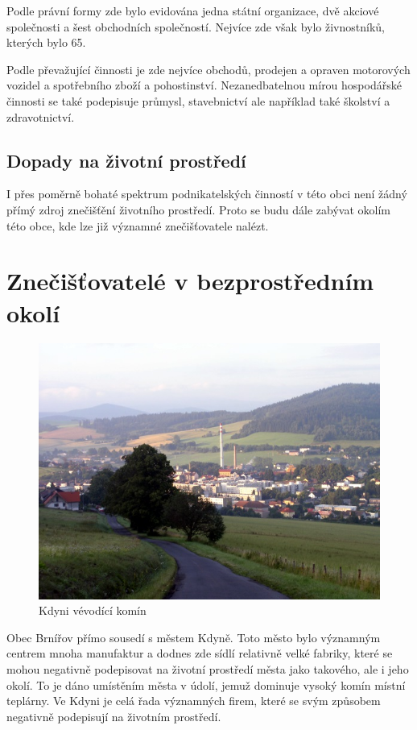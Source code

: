 \documentclass[12pt]{article} %
\begin{document}
Podle právní formy zde bylo evidována jedna státní organizace, dvě akciové společnosti a šest obchodních společností. Nejvíce zde však bylo živnostníků, kterých bylo 65.

Podle převažující činnosti je zde nejvíce obchodů, prodejen a opraven motorových vozidel a spotřebního zboží a pohostinství. Nezanedbatelnou mírou hospodářské činnosti se také podepisuje průmysl, stavebnictví ale například také školství a zdravotnictví.

\subsection{Dopady na životní prostředí}
I přes poměrně bohaté spektrum podnikatelských činností v této obci není žádný přímý zdroj znečišťění životního prostředí. Proto se budu dále zabývat okolím této obce, kde lze již významné znečišťovatele nalézt.

\section{Znečišťovatelé v bezprostředním okolí}
\begin{figure}
	\vspace{-20pt}
	\begin{center}
		\includegraphics[scale=0.4]{kdyne.jpg}
	\end{center}
	\vspace{-10pt}
	\caption{Kdyni vévodící komín}
	\vspace{-20pt}
\end{figure}
Obec Brnířov přímo sousedí s městem Kdyně. Toto město bylo významným centrem mnoha manufaktur a dodnes zde sídlí relativně velké fabriky, které se mohou negativně podepisovat na životní prostředí města jako takového, ale i jeho okolí. To je dáno umístěním města v údolí, jemuž dominuje vysoký komín místní teplárny. Ve Kdyni je celá řada významných firem,  které se svým způsobem negativně podepisují na životním prostředí.
\end{document}

